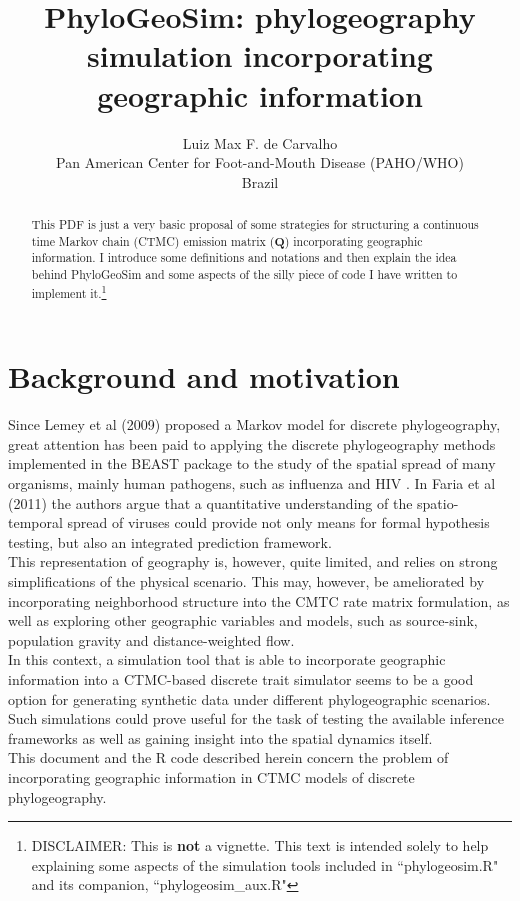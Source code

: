 \documentclass[a4paper,10pt]{article}
\title {PhyloGeoSim: phylogeography simulation incorporating geographic information}
\author{Luiz Max F. de Carvalho\\
Pan American Center for Foot-and-Mouth Disease (PAHO/WHO)\\
Brazil}
\begin{document}
\maketitle
\begin{abstract}
This PDF is just a very basic proposal of some strategies for structuring a continuous time Markov chain (CTMC) emission matrix ($\mathbf{Q}$) incorporating geographic information. I introduce some definitions and notations and then explain the idea behind PhyloGeoSim and some aspects of the silly piece of code I have written to implement it.\footnote{DISCLAIMER: This is \textbf{not} a vignette. This text is intended solely to help explaining some aspects of the simulation tools included in ``phylogeosim.R" and its companion, ``phylogeosim\_aux.R"}
\end{abstract}
\section{Background and motivation}
\indent Since Lemey et al (2009) \cite{Lemey2009} proposed a Markov model for discrete phylogeography, great attention has been paid to applying the discrete phylogeography methods implemented in the BEAST package to the study of the spatial spread of many organisms, mainly human pathogens, such as influenza \cite{Nelson2011,Bahl2011} and HIV \cite{Faria2012a,Faria2012b}. In Faria et al (2011) \cite{Faria2011} the authors argue that a quantitative understanding of the spatio-temporal spread of viruses could provide not only means for formal hypothesis testing, but also an integrated prediction framework.\\
\indent This representation of geography is, however, quite limited, and relies on strong simplifications of the physical scenario. This may, however, be ameliorated by incorporating neighborhood structure into the CMTC rate matrix formulation, as well as exploring other geographic variables and models, such as source-sink, population gravity and distance-weighted flow.\\ 
\indent In this context, a simulation tool that is able to  incorporate geographic information into a CTMC-based discrete trait simulator seems to be a good option for generating synthetic data under different phylogeographic scenarios. Such simulations could prove useful for the task of testing the available inference frameworks as well as gaining insight into the spatial dynamics itself.\\ 
\indent This document and the R code described herein concern the problem of incorporating geographic information in CTMC models of discrete phylogeography.\\
\end{document}
